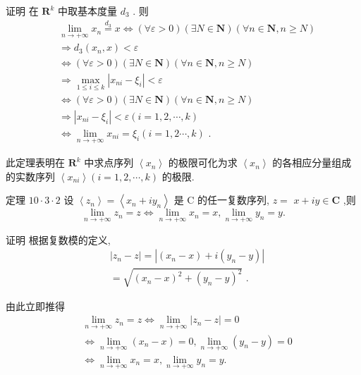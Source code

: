 证明 在 ${\mathbf{R}}^{k}$ 中取基本度量 ${d}_{3}$ . 则
\begin{align*}
	&\mathop{\lim }\limits_{{n \rightarrow   + \infty }}{x}_{n}\overset{{d}_{3}}{ = }x \Leftrightarrow  \left( {\forall \varepsilon  > 0}\right) \left( {\exists N \in  \mathbf{N}}\right) \left( {\forall n \in  \mathbf{N},n \geq  N}\right)\\
	&\Rightarrow  {d}_{3}\left( {{x}_{n},x}\right)  < \varepsilon\\
	&\Leftrightarrow  \left( {\forall \varepsilon  > 0}\right) \left( {\exists N \in  \mathbf{N}}\right) \left( {\forall n \in  \mathbf{N},n \geq  N}\right)\\
	&\Rightarrow  \mathop{\max }\limits_{{1 \leq  i \leq  k}}\left| {{x}_{ni} - {\xi }_{i}}\right|  < \varepsilon\\
	&\Leftrightarrow  \left( {\forall \varepsilon  > 0}\right) \left( {\exists N \in  \mathbf{N}}\right) \left( {\forall n \in  \mathbf{N},n \geq  N}\right)\\
	&\Rightarrow  \left| {{x}_{ni} - {\xi }_{i}}\right|  < \varepsilon \left( {i = 1,2,\cdots ,k}\right)\\
	&\Leftrightarrow  \mathop{\lim }\limits_{{n \rightarrow   + \infty }}{x}_{ni} = {\xi }_{i}\left( {i = 1,2\cdots ,k}\right) \text{ . }
\end{align*}

此定理表明在 ${\mathbf{R}}^{k}$ 中求点序列 $\left\langle  {x}_{n}\right\rangle$ 的极限可化为求 $\left\langle  {x}_{n}\right\rangle$ 的各相应分量组成的实数序列 $\left\langle  {x}_{ni}\right\rangle  \left( {i = 1,2,\cdots ,k}\right)$ 的极限.

定理 ${10} \cdot  3 \cdot  2$ 设 $\left\langle  {z}_{n}\right\rangle   = \left\langle  {{x}_{n} + i{y}_{n}}\right\rangle$ 是 $\mathrm{C}$ 的任一复数序列, $z =$  $x + {iy} \in  \mathbf{C}$ ,则
$$\mathop{\lim }\limits_{{n \rightarrow   + \infty }}{z}_{n} = z \Leftrightarrow  \mathop{\lim }\limits_{{n \rightarrow   + \infty }}{x}_{n} = x,\mathop{\lim }\limits_{{n \rightarrow   + \infty }}{y}_{n} = y.$$

证明 根据复数模的定义,
\begin{align*}
	&\left| {{z}_{n} - z}\right|  = \left| {\left( {{x}_{n} - x}\right)  + i\left( {{y}_{n} - y}\right) }\right|\\
	&= \sqrt{{\left( {x}_{n} - x\right) }^{2} + {\left( {y}_{n} - y\right) }^{2}}\text{ . }
\end{align*}

由此立即推得
\begin{align*}
	&\mathop{\lim }\limits_{{n \rightarrow   + \infty }}{z}_{n} = z \Leftrightarrow  \mathop{\lim }\limits_{{n \rightarrow   + \infty }}\left| {{z}_{n} - z}\right|  = 0\\
	&\Leftrightarrow  \mathop{\lim }\limits_{{n \rightarrow   + \infty }}\left( {{x}_{n} - x}\right)  = 0,\mathop{\lim }\limits_{{n \rightarrow   + \infty }}\left( {{y}_{n} - y}\right)  = 0\\
	&\Leftrightarrow  \mathop{\lim }\limits_{{n \rightarrow   + \infty }}{x}_{n} = x,\mathop{\lim }\limits_{{n \rightarrow   + \infty }}{y}_{n} = y.
\end{align*}

